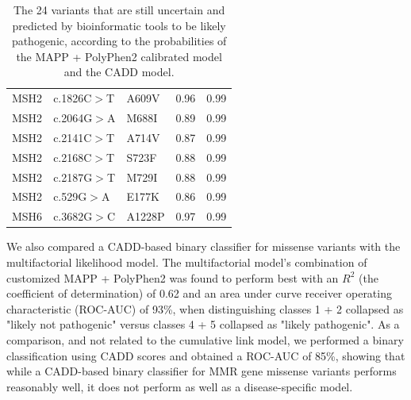 \begin{table}[h]
\begin{tabular}{ l l l r l }
  \rule{0pt}{2.5ex}MSH2 & c.1826C$>$T & A609V & 0.96 & 0.99 \\
  \rule{0pt}{2.5ex}MSH2 & c.2064G$>$A & M688I & 0.89 & 0.99 \\
  \rule{0pt}{2.5ex}MSH2 & c.2141C$>$T & A714V & 0.87 & 0.99 \\
  \rule{0pt}{2.5ex}MSH2 & c.2168C$>$T & S723F & 0.88 & 0.99 \\
  \rule{0pt}{2.5ex}MSH2 & c.2187G$>$T & M729I & 0.88 & 0.99 \\
  \rule{0pt}{2.5ex}MSH2 & c.529G$>$A & E177K & 0.86 & 0.99 \\
  \rule{0pt}{2.5ex}MSH6 & c.3682G$>$C & A1228P & 0.97 & 0.99 \\
  \hline
\end{tabular}
\caption[The 24 variants predicted to be likely pathogenic]{\label{table:caddmmr_overlap} The 24 variants that are still uncertain and predicted by bioinformatic tools to be likely pathogenic, according to the probabilities of the MAPP + PolyPhen2 calibrated model\cite{Thompson_2013b} and the CADD model.}
\end{table}

We also compared a CADD-based binary classifier for missense variants with the multifactorial likelihood model\cite{Thompson_2013b}.
The multifactorial model's combination of customized MAPP + PolyPhen2 was found to perform best with an $R^2$ (the coefficient of determination) of 0.62 and an area under curve receiver operating characteristic (ROC-AUC) of 93\%, when distinguishing classes 1 + 2 collapsed as "likely not pathogenic" versus classes 4 + 5 collapsed as "likely pathogenic".
As a comparison, and not related to the cumulative link model, we performed a binary classification using CADD scores and obtained a ROC-AUC of 85\%, showing that while a CADD-based binary classifier for MMR gene missense variants performs reasonably well, it does not perform as well as a disease-specific model.

